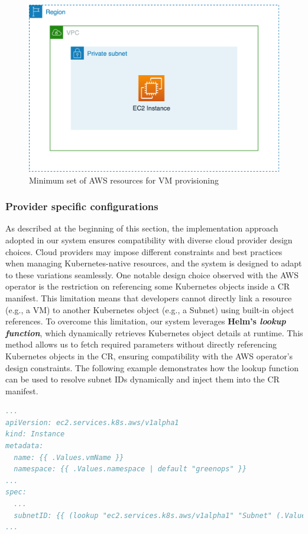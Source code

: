 \begin{figure}[H]
\centering
\includegraphics[width=0.75\linewidth]{images/aws.png}
\caption{Minimum set of AWS resources for VM provisioning}
\label{fig:aws}
\end{figure}

\subsubsection{Provider specific configurations}

As described at the beginning of this section, the implementation approach adopted in our system ensures compatibility with diverse cloud provider design choices. Cloud providers may impose different constraints and best practices when managing Kubernetes-native resources, and the system is designed to adapt to these variations seamlessly.
One notable design choice observed with the AWS operator is the restriction on referencing some Kubernetes objects inside a CR manifest. 
This limitation means that developers cannot directly link a resource (e.g., a VM) to another Kubernetes object (e.g., a Subnet) using built-in object references.
To overcome this limitation, our system leverages \textbf{Helm’s \textit{lookup function}}, which dynamically retrieves Kubernetes object details at runtime. This method allows us to fetch required parameters without directly referencing Kubernetes objects in the CR, ensuring compatibility with the AWS operator’s design constraints. The following example demonstrates how the lookup function can be used to resolve subnet IDs dynamically and inject them into the CR manifest. \newline

\begin{lstlisting}[language=yaml, caption={Helm Lookup example: dynamically resolving SubnetIDs}, label={lst:helm_lookup}, float=htpb]
...
apiVersion: ec2.services.k8s.aws/v1alpha1
kind: Instance
metadata:
  name: {{ .Values.vmName }}
  namespace: {{ .Values.namespace | default "greenops" }}
...
spec:
  ...
  subnetID: {{ (lookup "ec2.services.k8s.aws/v1alpha1" "Subnet" (.Values.namespace | default "greenops") (printf "%s-subnet" .Values.vmName)).status.subnetID }}
...
\end{lstlisting}

